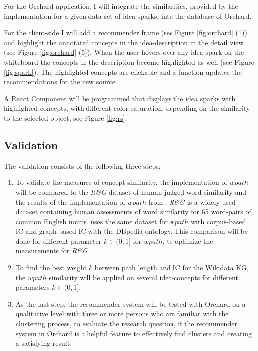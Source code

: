 \documentclass[pdftex,a4paper,12pt]{scrartcl}
\theoremstyle{definition}
\begin{document}
    For the Orchard application, I will integrate the similarities, provided by the implementation for a given data-set of idea sparks, into the database of Orchard. 

    For the client-side I will add a recommender frame (see Figure \ref{fig:orchard} (1)) and highlight the annotated concepts in the idea-description in the detail view (see Figure \ref{fig:orchard} (5)). When the user hovers over any idea spark on the whiteboard the concepts in the description become highlighted as well (see Figure \ref{fig:spark}). The highlighted concepts are clickable and a function updates the recommendations for the new source. 

    A React Component will be programmed that displays the idea sparks with highlighted concepts, with different color saturation, depending on the similarity to the selected object, see Figure \ref{fig:rs}.
    
    \subsection{Validation}
    The validation consists of the following three steps:  
    \begin{enumerate}
        \item To validate the measures of concept similarity, the implementation of $wpath$ will be compared to the \textit{R\&G} dataset \citep{rubenstein_contextual_1965} of human-judged word similarity and the results of the implementation of $wpath$ from \citet{zhu_computing_2017}. \textit{R\&G} is a widely used dataset containing human assessments of word similarity for 65 word-pairs of common English nouns.
        \citet{zhu_computing_2017} uses the same dataset for $wpath$ with corpus-based IC and graph-based IC with the DBpedia ontology. This comparison will be done for different parameter $k \in (0,1]$ for $wpath$, to optimize the measurements for \textit{R\&G}. 
        \item To find the best weight $k$ between path length and IC for the Wikidata KG, the $wpath$ similarity will be applied on several idea-concepts for different parameters $k \in (0,1]$.
        \item  As the last step, the recommender system will be tested with Orchard on a qualitative level with three or more persons who are familiar with the clustering process, to evaluate the research question, if the recommender system in Orchard is a helpful feature to effectively find clusters and creating a satisfying result. 
    \end{enumerate}
    
\end{document}
